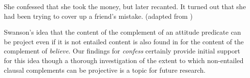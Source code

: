 \documentclass[11pt,fleqn]{article}
\newcommand{\6}{\mbox{$[\hspace*{-.6mm}[$}}
\newcommand{\9}{\mbox{$]\hspace*{-.6mm}]$}}
\begin{document}
\begin{exe}
\ex\label{confess} She confessed that she took the money, but later recanted. It turned out that she had been trying to cover up a friend's mistake. \hfill (adapted from \citealt[1540]{swanson2012})
\end{exe}
%
%
Swanson's idea that the content of the complement of an attitude predicate can be project even if it is not entailed content is also found in \citet{best-question} for the content of the complement of {\em believe}. Our findings for {\em confess} certainly provide initial support for this idea though a thorough investigation of the extent to which non-entailed clausal complements can be projective is a topic for future research.
\end{document}

